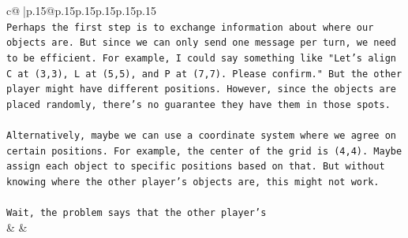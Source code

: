 \documentclass{article}
\begin{document}
{\begin{supertabular}{c@{$\;$}|p{.15\linewidth}@{}p{.15\linewidth}p{.15\linewidth}p{.15\linewidth}p{.15\linewidth}p{.15\linewidth}}
{{{\\ 
\texttt{Perhaps the first step is to exchange information about where our objects are. But since we can only send one message per turn, we need to be efficient. For example, I could say something like "Let's align C at (3,3), L at (5,5), and P at (7,7). Please confirm." But the other player might have different positions. However, since the objects are placed randomly, there's no guarantee they have them in those spots. } \\
\\ 
\texttt{Alternatively, maybe we can use a coordinate system where we agree on certain positions. For example, the center of the grid is (4,4). Maybe assign each object to specific positions based on that. But without knowing where the other player's objects are, this might not work. } \\
\\ 
\texttt{Wait, the problem says that the other player's} \\
            }
        }
    }
    & & \\ \\


\end{supertabular}}
\end{document}
